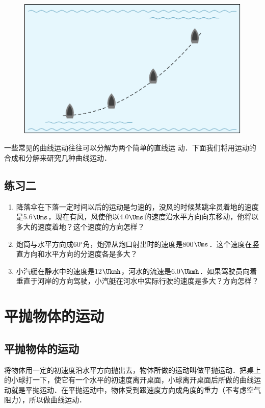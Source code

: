 \begin{figure}[htbp]
    \centering
    \includegraphics{fig/A/4-8.pdf}
    \caption{}\label{fig_A_4-8}
\end{figure}

一些常见的曲线运动往往可以分解为两个简单的直线运
动．下面我们将用运动的合成和分解来研究几种曲线运动．

\subsection*{练习二}
\begin{enumerate}
	\item 降落伞在下落一定时间以后的运动是匀速的，没风的时候某跳伞员着地的速度是5.6$\Ums$，现在有风，风使他以4.0$\Ums$的速度沿水平方向向东移动，他将以多大的速度着地？这个速度的方向怎样？
\item 炮筒与水平方向成60$^\circ$角，炮弹从炮口射出时的速度是800$\Ums$．这个速度在竖直方向和水平方向的分速度各是多大？
\item 小汽艇在静水中的速度是12$\Ukmh$，河水的流速是6.0$\Ukmh$．如果驾驶员向着垂直于河岸的方向驾驶，小汽艇在河水中实际行驶的速度是多大？方向怎样？
\end{enumerate}


\section{平抛物体的运动}
\subsection{平抛物体的运动} 

将物体用一定的初速度沿水平方向抛出去，物体所做的运动叫做平抛运动．把桌上的小球打一下，使它有一个水平的初速度离开桌面，小球离开桌面后所做的曲线运动就是平抛运动．在平抛运动中，物体受到跟速度方向成角度的重力（不考虑空气阻力），所以做曲线运动．


